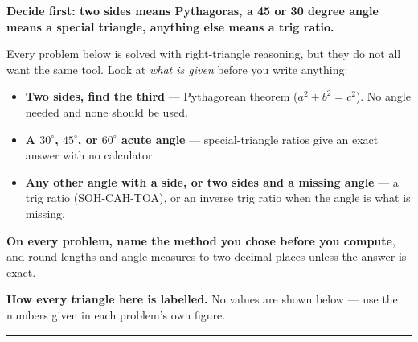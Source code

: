 \documentclass[12pt]{article}
\begin{document}


\noindent\textbf{Decide first: two sides means Pythagoras, a 45 or 30 degree
angle means a special triangle, anything else means a trig ratio.}

\smallskip
\noindent\small Every problem below is solved with right-triangle reasoning,
but they do not all want the same tool. Look at \emph{what is given} before you
write anything:
\begin{itemize}[leftmargin=1.1cm, itemsep=1pt, topsep=2pt]
  \item \textbf{Two sides, find the third} --- Pythagorean theorem
        ($a^2 + b^2 = c^2$). No angle needed and none should be used.
  \item \textbf{A $30^\circ$, $45^\circ$, or $60^\circ$ acute angle} ---
        special-triangle ratios give an exact answer with no calculator.
  \item \textbf{Any other angle with a side, or two sides and a missing
        angle} --- a trig ratio (SOH-CAH-TOA), or an inverse trig ratio when
        the angle is what is missing.
\end{itemize}
\textbf{On every problem, name the method you chose before you compute}, and
round lengths and angle measures to two decimal places unless the answer is
exact.\normalsize

\smallskip
\noindent\textbf{How every triangle here is labelled.} No values are shown
below --- use the numbers given in each problem's own figure.

\noindent\rule{\linewidth}{0.4pt}








\end{document}
